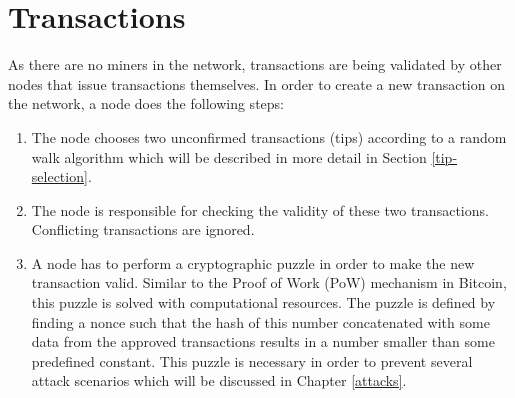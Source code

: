 \section{Transactions}\label{transactions}

As there are no miners in the network, transactions are being validated by other nodes that issue transactions themselves. In order to create a new transaction on the network, a node does the following steps:
\begin{enumerate}
    \item The node chooses two unconfirmed transactions (tips) according to a random walk algorithm which will be described in more detail in Section \ref{tip-selection}.
    \item The node is responsible for checking the validity of these two transactions. Conflicting transactions are ignored.
    \item A node has to perform a cryptographic puzzle in order to make the new transaction valid. Similar to the Proof of Work (PoW) mechanism in Bitcoin, this puzzle is solved with computational resources. The puzzle is defined by finding a nonce such that the hash of this number concatenated with some data from the approved transactions results in a number smaller than some predefined constant. This puzzle is necessary in order to prevent several attack scenarios which will be discussed in Chapter \ref{attacks}.
\end{enumerate}

